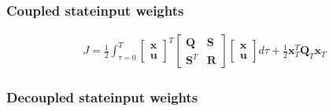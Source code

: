\documentclass[letterpaper,10pt,english]{jupyterBook}
\begin{document}
\subsubsection*{Coupled state\sphinxhyphen{}input weights}
\begin{equation*}
\begin{split}J = \frac{1}{2} \int_{\tau=0}^{T} \begin{bmatrix} \mathbf{x} \\ \mathbf{u} \end{bmatrix}^T \begin{bmatrix} \mathbf{Q} & \mathbf{S} \\ \mathbf{S}^T & \mathbf{R} \end{bmatrix} \begin{bmatrix} \mathbf{x} \\ \mathbf{u} \end{bmatrix} d \tau + \frac{1}{2} \mathbf{x}_T^T \mathbf{Q}_T \mathbf{x}_T\end{split}
\end{equation*}\subsubsection*{Decoupled state\sphinxhyphen{}input weights}
\end{document}
